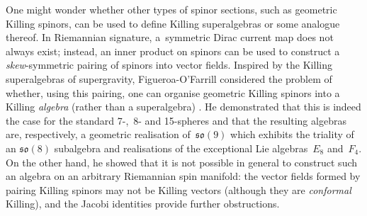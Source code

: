 \documentclass[10pt,a4paper]{amsart}
\numberwithin{equation}{section}
\newcommand{\1}{\mathbbm{1}}
\begin{document}
One might wonder whether other types of spinor sections, such as geometric Killing spinors, can be used to define Killing superalgebras or some analogue thereof. In Riemannian signature, a~symmetric Dirac current map does not always exist; instead, an inner product on spinors can be used to construct a \emph{skew}-symmetric pairing of spinors into vector fields. Inspired by the Killing superalgebras of supergravity, Figueroa-O'Farrill considered the problem of whether, using this pairing, one can organise geometric Killing spinors into a Killing \emph{algebra} (rather than a superalgebra) \cite{Figueroa-OFarrill2008_except}. He demonstrated that this is indeed the case for the standard \mbox{7-,}~8- and 15-spheres and that the resulting algebras are, respectively, a geometric realisation of~$\mathfrak{so}(9)$ which exhibits the triality of an $\mathfrak{so}(8)$ subalgebra and realisations of the exceptional Lie algebras~$E_8$ and~$F_4$. On the other hand, he showed that it is not possible in general to construct such an algebra on an arbitrary Riemannian spin manifold: the vector fields formed by pairing Killing spinors may not be Killing vectors (although they are \emph{conformal} Killing), and the Jacobi identities provide further obstructions.
\end{document}
